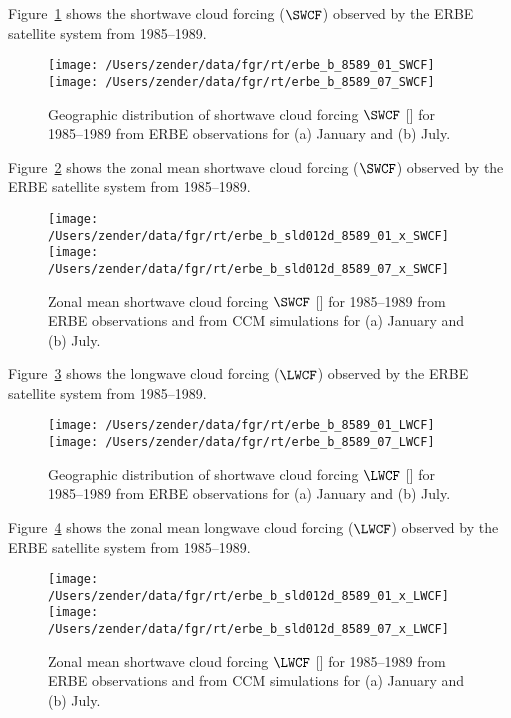 \documentclass[12pt]{article}
\begin{document}
Figure~\ref{fgr:SWCF} shows the shortwave cloud forcing ($\SWCF$)
observed by the ERBE satellite system from 1985--1989.
\begin{figure*}
\centering
\texttt{[image: /Users/zender/data/fgr/rt/erbe\_b\_8589\_01\_SWCF]}\vfill
\texttt{[image: /Users/zender/data/fgr/rt/erbe\_b\_8589\_07\_SWCF]}%
\caption[Seasonal Shortwave Cloud Forcing]{
Geographic distribution of shortwave cloud forcing $\SWCF$ [\wxmS] 
for 1985--1989 from ERBE observations for (a) January and (b) July.
\label{fgr:SWCF}}
\end{figure*}

Figure~\ref{fgr:SWCF_x} shows the zonal mean shortwave cloud forcing
($\SWCF$) observed by the ERBE satellite system from 1985--1989.
\begin{figure*}
\centering
\texttt{[image: /Users/zender/data/fgr/rt/erbe\_b\_sld012d\_8589\_01\_x\_SWCF]}\vfill
\texttt{[image: /Users/zender/data/fgr/rt/erbe\_b\_sld012d\_8589\_07\_x\_SWCF]}%
\caption[Zonal Mean Shortwave Cloud Forcing]{
Zonal mean shortwave cloud forcing $\SWCF$ [\wxmS] 
for 1985--1989 from ERBE observations and from CCM simulations for (a)
January and (b) July. 
\label{fgr:SWCF_x}}
\end{figure*}

Figure~\ref{fgr:LWCF} shows the longwave cloud forcing ($\LWCF$)
observed by the ERBE satellite system from 1985--1989.
\begin{figure*}
\centering
\texttt{[image: /Users/zender/data/fgr/rt/erbe\_b\_8589\_01\_LWCF]}\vfill
\texttt{[image: /Users/zender/data/fgr/rt/erbe\_b\_8589\_07\_LWCF]}%
\caption[Seasonal Longwave Cloud Forcing]{
Geographic distribution of shortwave cloud forcing $\LWCF$ [\wxmS] 
for 1985--1989 from ERBE observations for (a) January and (b) July.
\label{fgr:LWCF}}
\end{figure*}

Figure~\ref{fgr:LWCF_x} shows the zonal mean longwave cloud forcing
($\LWCF$) observed by the ERBE satellite system from 1985--1989.
\begin{figure*}
\centering
\texttt{[image: /Users/zender/data/fgr/rt/erbe\_b\_sld012d\_8589\_01\_x\_LWCF]}\vfill
\texttt{[image: /Users/zender/data/fgr/rt/erbe\_b\_sld012d\_8589\_07\_x\_LWCF]}%
\caption[Zonal Mean Longwave Cloud Forcing]{
Zonal mean shortwave cloud forcing $\LWCF$ [\wxmS] 
for 1985--1989 from ERBE observations and from CCM simulations for (a)
January and (b) July. 
\label{fgr:LWCF_x}}
\end{figure*}
\end{document}
